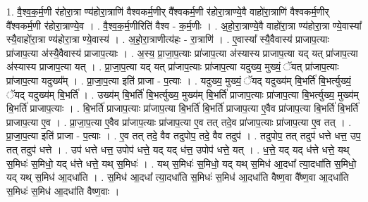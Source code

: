 \documentclass[17pt]{extarticle}
\begin{document}
1. वै॒श्व॒क॒र्म॒णी र॑होरा॒त्रा ण्य॑होरा॒त्राणि॑ वैश्वकर्म॒णीर् वै᳚श्वकर्म॒णी र॑होरा॒त्राण्ये॒वै वाहो॑रा॒त्राणि॑ वैश्वकर्म॒णीर् वै᳚श्वकर्म॒णी र॑होरा॒त्राण्ये॒व । . वै॒श्व॒क॒र्म॒णीरिति॑ वैश्व - क॒र्म॒णीः । . अ॒हो॒रा॒त्राण्ये॒वै वाहो॑रा॒त्रा ण्य॑होरा॒त्रा ण्ये॒वास्या᳚ स्यै॒वाहो॑रा॒त्रा ण्य॑होरा॒त्रा ण्ये॒वास्य॑ । . अ॒हो॒रा॒त्राणीत्य॑हः - रा॒त्राणि॑ । . ए॒वास्या᳚ स्यै॒वैवास्य॑ प्राजाप॒त्याः प्रा॑जाप॒त्या अ॑स्यै॒वैवास्य॑ प्राजाप॒त्याः । . अ॒स्य॒ प्रा॒जा॒प॒त्याः प्रा॑जाप॒त्या अ॑स्यास्य प्राजाप॒त्या यद् यत् प्रा॑जाप॒त्या अ॑स्यास्य प्राजाप॒त्या यत् । . प्रा॒जा॒प॒त्या यद् यत् प्रा॑जाप॒त्याः प्रा॑जाप॒त्या यदुख्य॒ मुख्यं॒ ॅयत् प्रा॑जाप॒त्याः प्रा॑जाप॒त्या यदुख्य᳚म् । . प्रा॒जा॒प॒त्या इति॑ प्राजा - प॒त्याः । . यदुख्य॒ मुख्यं॒ ॅयद् यदुख्य॑म् बि॒भर्ति॑ बि॒भर्त्युख्यं॒ ॅयद् यदुख्य॑म् बि॒भर्ति॑ । . उख्य॑म् बि॒भर्ति॑ बि॒भर्त्युख्य॒ मुख्य॑म् बि॒भर्ति॑ प्राजाप॒त्याः प्रा॑जाप॒त्या बि॒भर्त्युख्य॒ मुख्य॑म् बि॒भर्ति॑ प्राजाप॒त्याः । . बि॒भर्ति॑ प्राजाप॒त्याः प्रा॑जाप॒त्या बि॒भर्ति॑ बि॒भर्ति॑ प्राजाप॒त्या ए॒वैव प्रा॑जाप॒त्या बि॒भर्ति॑ बि॒भर्ति॑ प्राजाप॒त्या ए॒व । . प्रा॒जा॒प॒त्या ए॒वैव प्रा॑जाप॒त्याः प्रा॑जाप॒त्या ए॒व तत् तदे॒व प्रा॑जाप॒त्याः प्रा॑जाप॒त्या ए॒व तत् । . प्रा॒जा॒प॒त्या इति॑ प्राजा - प॒त्याः । . ए॒व तत् तदे॒ वैव तदुपोप॒ तदे॒ वैव तदुप॑ । . तदुपोप॒ तत् तदुप॑ धत्ते धत्त॒ उप॒ तत् तदुप॑ धत्ते । . उप॑ धत्ते धत्त॒ उपोप॑ धत्ते॒ यद् यद् ध॑त्त॒ उपोप॑ धत्ते॒ यत् । . ध॒त्ते॒ यद् यद् ध॑त्ते धत्ते॒ यथ् स॒मिधः॑ स॒मिधो॒ यद् ध॑त्ते धत्ते॒ यथ् स॒मिधः॑ । . यथ् स॒मिधः॑ स॒मिधो॒ यद् यथ् स॒मिध॑ आ॒दधा᳚ त्या॒दधा॑ति स॒मिधो॒ यद् यथ् स॒मिध॑ आ॒दधा॑ति । . स॒मिध॑ आ॒दधा᳚ त्या॒दधा॑ति स॒मिधः॑ स॒मिध॑ आ॒दधा॑ति वैष्ण॒वा वै᳚ष्ण॒वा आ॒दधा॑ति स॒मिधः॑ स॒मिध॑ आ॒दधा॑ति वैष्ण॒वाः । \newline
\end{document}
